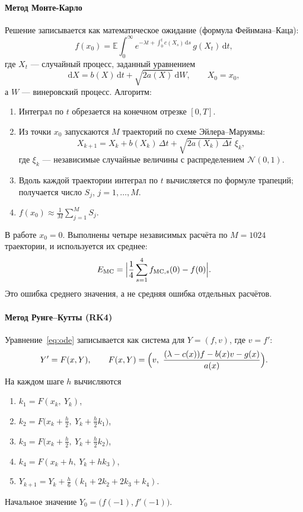 \documentclass[14pt,a4paper]{extarticle}
\newcommand{\dd}{\mathrm{d}}
\begin{document}
\paragraph{Метод Монте-Карло\\}
Решение записывается как математическое ожидание (формула
Фейнмана--Каца):
\[
f(x_0)=\mathbb E\int_0^\infty
e^{-\lambda t+\int_0^t c(X_s)\,\dd s}\,g(X_t)\,\dd t,
\]
где $X_t$ --- случайный процесс, заданный уравнением
\[
\dd X=b(X)\,\dd t+\sqrt{2a(X)}\,\dd W,\qquad X_0=x_0,
\]
а $W$ --- винеровский процесс.
Алгоритм:
\begin{enumerate}
\item Интеграл по $t$ обрезается на конечном отрезке $[0,T]$.
\item Из точки $x_0$ запускаются $M$ траекторий по схеме
Эйлера--Маруямы:
\[
X_{k+1}=X_k+b(X_k)\,\Delta t+\sqrt{2a(X_k)\,\Delta t}\;\xi_k,
\]
где $\xi_k$ --- независимые случайные величины с распределением
$\mathcal N(0,1)$.
\item Вдоль каждой траектории интеграл по $t$ вычисляется по формуле
трапеций; получается число $S_j$, $j=1,\dots,M$.
\item $f(x_0)\approx\frac1M\sum_{j=1}^MS_j$.
\end{enumerate}
В работе $x_0=0$. Выполнены четыре независимых расчёта
по $M=1024$ траектории, и используется их среднее:
\[
E_{\mathrm{MC}}=\Bigl|\frac14\sum_{s=1}^4 f_{\mathrm{MC},s}(0)-f(0)\Bigr|.
\]
Это ошибка среднего значения, а не средняя ошибка отдельных расчётов.

\paragraph{Метод Рунге--Кутты (RK4)\\}
Уравнение~\eqref{eq:ode} записывается как система для $Y=(f,v)$, где
$v=f'$:
\[
Y'=F(x,Y),\qquad
F(x,Y)=\Bigl(v,\ \frac{(\lambda-c(x))f-b(x)v-g(x)}{a(x)}\Bigr).
\]
На каждом шаге $h$ вычисляются
\begin{enumerate}
\item $k_1=F(x_k,\ Y_k)$,
\item $k_2=F\bigl(x_k+\tfrac h2,\ Y_k+\tfrac h2k_1\bigr)$,
\item $k_3=F\bigl(x_k+\tfrac h2,\ Y_k+\tfrac h2k_2\bigr)$,
\item $k_4=F(x_k+h,\ Y_k+hk_3)$,
\item $Y_{k+1}=Y_k+\tfrac h6\,(k_1+2k_2+2k_3+k_4)$.
\end{enumerate}
Начальное значение $Y_0=\bigl(f(-1),f'(-1)\bigr)$.
\end{document}
